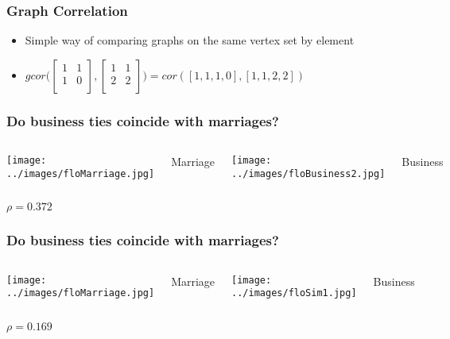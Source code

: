 \documentclass{beamer}
\begin{document}
\begin{frame}
\frametitle{Graph Correlation}
\begin{itemize}
\pause
\item Simple way of comparing graphs on the same vertex set by element
\pause
\item $gcor \bigg(\begin{bmatrix}
1&1\\
1&0\\
\end{bmatrix},
\begin{bmatrix}
1&1\\
2&2\\
\end{bmatrix}
\bigg)=cor([1,1,1,0],[1,1,2,2])$
\end{itemize}
\end{frame}

\begin{frame}
\frametitle{Do business ties coincide with marriages?}

\begin{columns}
\column{5.5cm} %
\texttt{[image: ../images/floMarriage.jpg]}
\begin{center}
Marriage
\end{center}
\column{6cm} %
\texttt{[image: ../images/floBusiness2.jpg]}
\begin{center}
Business
\end{center}
\end{columns}
\begin{center}
$\rho = 0.372$
\end{center}
\end{frame}

\begin{frame}
\frametitle{Do business ties coincide with marriages?}

\begin{columns}
\column{5.5cm} %
\texttt{[image: ../images/floMarriage.jpg]}
\begin{center}
Marriage
\end{center}
\column{6cm} %
\texttt{[image: ../images/floSim1.jpg]}
\begin{center}
Business
\end{center}
\end{columns}
\pause
\begin{center}
$\rho = 0.169$
\end{center}
\end{frame}
\end{document}
